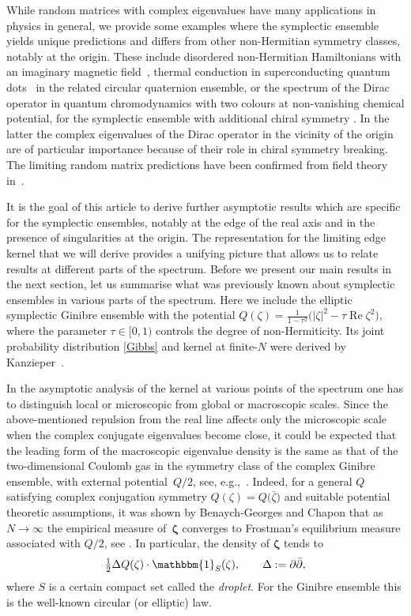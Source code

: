 \documentclass[pdftex]{sigma}
\numberwithin{equation}{section}
\newcommand{\re}{\operatorname{Re}}
\newcommand{\1}{\chi}
\begin{document}
While random matrices with complex eigenvalues have many applications in physics in general, we provide some examples
where the symplectic ensemble yields unique predictions and differs from other non-Hermitian symmetry classes, notably at the origin. These include disordered non-Hermitian Hamiltonians with an imaginary magnetic field~\cite{EK},
thermal conduction in superconducting quantum dots~\cite{DBB} in the related circular quaternion ensemble,
or the spectrum of the Dirac operator in quantum chromodynamics with two colours at non-vanishing chemical
potential, for the symplectic ensemble with additional chiral symmetry \cite{MR2180006}.
In the latter the complex eigenvalues of the Dirac operator in the vicinity of the origin are of particular importance because of their role in chiral symmetry breaking. The limiting random matrix predictions have been confirmed from field theory in~\cite{ABi06}.

It is the goal of this article to derive further asymptotic results which are specific for the symplectic ensembles, notably at the edge of the real axis and in the presence of singularities at the origin. The representation for the limiting
edge kernel that we will derive provides a unifying picture that allows us to relate results at different parts of the spectrum. Before we present our main results in the next section, let us summarise what was previously known about symplectic ensembles in various parts of the spectrum. Here we include the elliptic symplectic Ginibre ensemble with the potential $Q(\zeta)=
\tfrac{1}{1-\tau^2} \big( |\zeta|^2-\tau \re \zeta^2 \big)$, where the parameter $\tau\in[0,1)$ controls the degree of non-Hermiticity. Its joint probability distribution \eqref{Gibbs} and kernel at finite-$N$ were derived by Kanzieper~\cite{MR1928853}.

In the asymptotic analysis of the kernel at various points of the spectrum one has to distinguish local or microscopic from global or macroscopic scales.
Since the above-mentioned repulsion from the real line affects only the microscopic scale when the complex conjugate eigenvalues become close, it could be expected that the leading form of the macroscopic eigenvalue density is the same as that of the two-dimensional Coulomb gas in the symmetry class of the complex Ginibre ensemble, with external potential~$Q/2$,
see, e.g.,~\cite{MR3458536}. Indeed, for a general $Q$ satisfying complex conjugation symmetry $Q(\zeta)=Q\big(\bar{\zeta}\big)$ and suitable potential theoretic assumptions, it was shown by Benaych-Georges and Chapon that as $N \to \infty$ the empirical measure of~$\boldsymbol{\zeta}$ converges to Frostman's equilibrium measure associated with $Q/2$, see \cite[Theorem~3.1]{MR2934715}.
In particular, the density of $\boldsymbol{\zeta}$ tends to
\begin{gather} \label{density}
	\tfrac12 \Delta Q(\zeta) \cdot \mathbbm{1}_S(\zeta), \qquad \Delta:=\partial \bar{\partial},
\end{gather}
where $S$ is a certain compact set called the \emph{droplet}. For the Ginibre ensemble this is the well-known circular (or elliptic) law.
\end{document}
